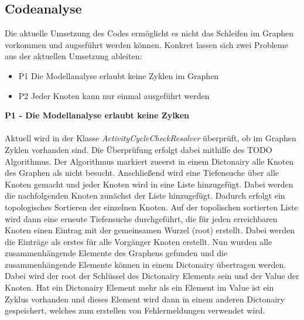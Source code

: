 \documentclass{article}
\begin{document}
    \subsection{Codeanalyse}
    \label{Codeanalyse}
        Die aktuelle Umsetzung des Codes ermöglicht es nicht das Schleifen im Graphen vorkommen und augseführt werden können. 
        Konkret lassen sich zwei Probleme aus der aktuellen Umsetzung ableiten:
        \begin{itemize}
            \item P1 Die Modellanalyse erlaubt keine Zyklen im Graphen
            \item P2 Jeder Knoten kann nur einmal ausgeführt werden
        \end{itemize}
        \textbf{P1 - Die Modellanalyse erlaubt keine Zylken}\\
        \\
        Aktuell wird in der Klasse \textit{ActivityCycleCheckResolver} überprüft, ob im Graphen Zyklen vorhanden sind. 
        Die Überprüfung erfolgt dabei mithilfe des TODO Algorithmus.
        Der Algorithmus markiert zueerst in einem Dictonairy alle Knoten des Graphen als nicht besucht. 
        Anschließend wird eine Tiefensuche über alle Knoten gemacht und jeder Knoten wird in eine Liste hinzugefügt. 
        Dabei werden die nachfolgenden Knoten zunächst der Liste hinzugefügt. 
        Dadurch erfolgt ein topologisches Sortieren der einzelnen Knoten.
        Auf der topolischen sortierten Liste wird dann eine erneute Tiefensuche durchgeführt, die für jeden erreichbaren Knoten einen Eintrag mit der gemeinsamen Wurzel (root) erstellt. 
        Dabei werden die Einträge als erstes für alle Vorgänger Knoten erstellt.
        Nun wurden alle zusammenhängende Elemente des Graphens gefunden und die zusammenhängende Elemente können in einem Dictonairy übertragen werden. 
        Dabei wird der root der Schlüssel des Dictonairy Elements sein und der Value der Knoten. %
        Hat ein Dictonairy Element mehr als ein Element im Value ist ein Zyklus vorhanden und dieses Element wird dann in einem anderen Dictonairy gespeichert, welches zum erstellen von Fehlermeldungen verwendet wird.
\end{document}
